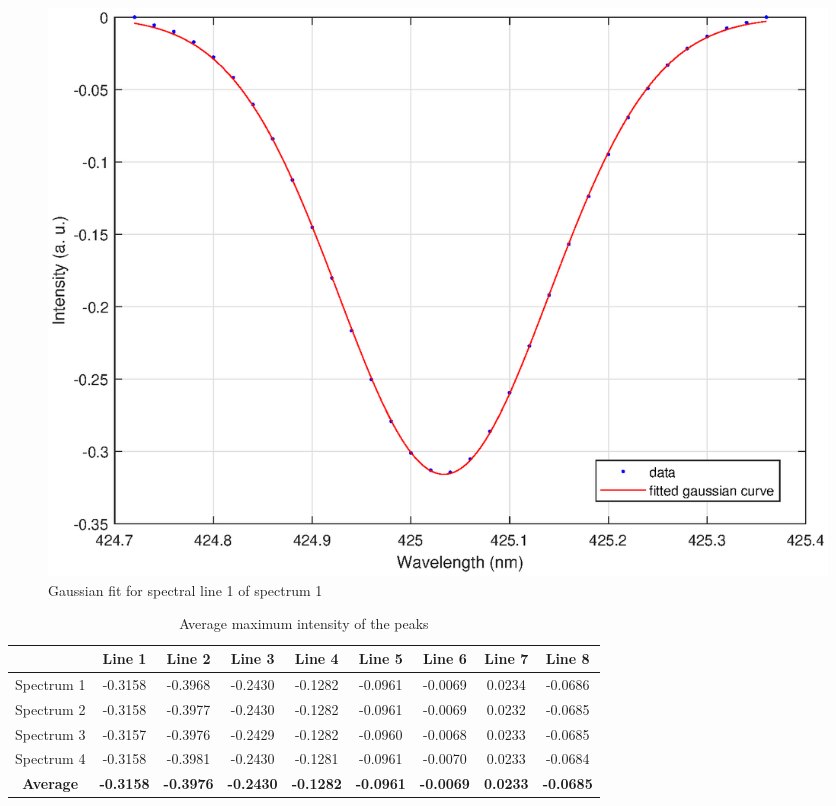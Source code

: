 \begin{figure}[H]
    \centering
    \includegraphics[width = 1\textwidth ]{figures/gauss_1.eps}
    \caption{Gaussian fit for spectral line 1 of spectrum 1 }
    \label{fig:Figure 12}
\end{figure}


\begin{table}[H]
    \centering
    \caption{Average maximum intensity of the peaks}
    \begin{tabular}{|c|c|c|c|c|c|c|c|c|}
    \centering
    \textbf{}   & \textbf{Line 1} & \textbf{Line 2} &  \textbf{Line 3} & \textbf{Line 4} & \textbf{Line 5} & \textbf{Line 6} & \textbf{Line 7} & \textbf{Line 8}\\ \hline \hline
    Spectrum 1   & -0.3158    & -0.3968    & -0.2430 & -0.1282  & -0.0961 & -0.0069 & 0.0234 & -0.0686 \\ \hline   
    Spectrum 2   & -0.3158    & -0.3977    & -0.2430 & -0.1282  & -0.0961 & -0.0069 & 0.0232 & -0.0685\\ \hline
    Spectrum 3   & -0.3157    & -0.3976    & -0.2429 & -0.1282  & -0.0960 & -0.0068 & 0.0233 & -0.0685\\ \hline
    Spectrum 4   & -0.3158    & -0.3981    & -0.2430 & -0.1281  & -0.0961 & -0.0070 & 0.0233 & -0.0684\\ \hline
   \textbf{Average}   & \textbf{-0.3158}    & \textbf{-0.3976}    & \textbf{-0.2430} & \textbf{-0.1282}  & \textbf{-0.0961} &\textbf{ -0.0069} & \textbf{0.0233} & \textbf{-0.0685}
    \end{tabular}
    \label{tab:table2}
\end{table}

